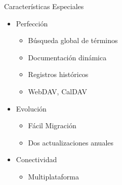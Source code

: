     \begin{frame}{Características Especiales}
    	\begin{itemize}
    		\item Perfección
			\begin{itemize}
				\item Búsqueda global de términos
				\item Documentación dinámica
				\item Registros históricos
				\item WebDAV, CalDAV
			
			\end{itemize}
    		\item Evolución
    			\begin{itemize}
    				\item Fácil Migración
    				\item Dos actualizaciones anuales
    			\end{itemize}
    		\item Conectividad
			\begin{itemize}
    				\item Multiplataforma
    			\end{itemize}
    	\end{itemize}
    \end{frame}






